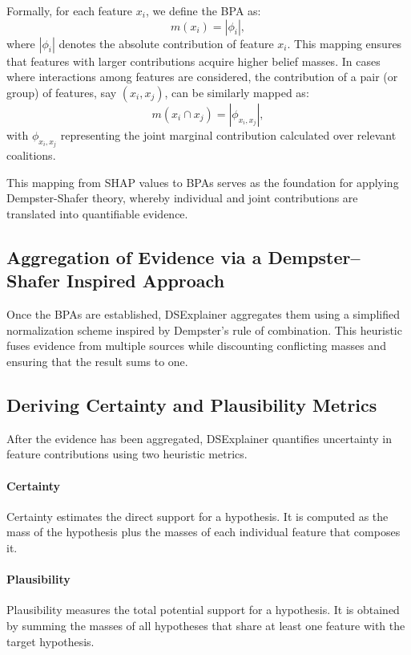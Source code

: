 \documentclass[acmlarge]{acmart}
\begin{document}
Formally, for each feature \( x_i \), we define the BPA as:
\[
m(x_i) = |\phi_i|,
\]
where \( |\phi_i| \) denotes the absolute contribution of feature \( x_i \). This mapping ensures that features with larger contributions acquire higher belief masses. In cases where interactions among features are considered, the contribution of a pair (or group) of features, say \( (x_i, x_j) \), can be similarly mapped as:
\[
m(x_i \cap x_j) = |\phi_{x_i, x_j}|,
\]
with \( \phi_{x_i, x_j} \) representing the joint marginal contribution calculated over relevant coalitions.

This mapping from SHAP values to BPAs serves as the foundation for applying Dempster-Shafer theory, whereby individual and joint contributions are translated into quantifiable evidence.

\subsection{Aggregation of Evidence via a Dempster--Shafer Inspired Approach}

Once the BPAs are established, DSExplainer aggregates them using a simplified normalization scheme inspired by Dempster's rule of combination. This heuristic fuses evidence from multiple sources while discounting conflicting masses and ensuring that the result sums to one.

\subsection{Deriving Certainty and Plausibility Metrics}

After the evidence has been aggregated, DSExplainer quantifies uncertainty in feature contributions using two heuristic metrics.

\paragraph{Certainty}
Certainty estimates the direct support for a hypothesis. It is computed as the mass of the hypothesis plus the masses of each individual feature that composes it.

\paragraph{Plausibility}
Plausibility measures the total potential support for a hypothesis. It is obtained by summing the masses of all hypotheses that share at least one feature with the target hypothesis.
\end{document}
